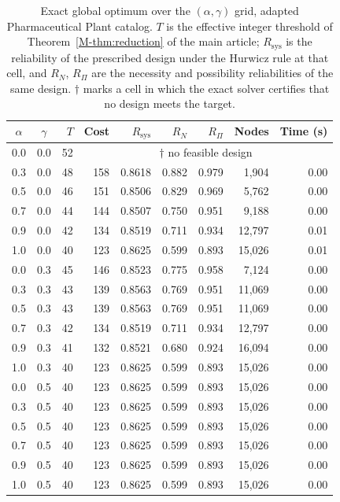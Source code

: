 \begin{table}[!htbp]
\centering
\caption{Exact global optimum over the $(\alpha,\gamma)$ grid, adapted Pharmaceutical Plant catalog. $T$ is the effective integer threshold of Theorem~\ref*{M-thm:reduction} of the main article; $R_{\mathrm{sys}}$ is the reliability of the prescribed design under the Hurwicz rule at that cell, and $R_N$, $R_\Pi$ are the necessity and possibility reliabilities of the same design. $\dagger$ marks a cell in which the exact solver certifies that no design meets the target.}
\label{tab:pharma_stats}
\small
\begin{tabular}{ccrrrrrrr}
\hline
$\alpha$ & $\gamma$ & $T$ & Cost & $R_{\mathrm{sys}}$ & $R_N$ & $R_\Pi$ & Nodes & Time (s)\\
\hline
0.0 & 0.0 & 52 & \multicolumn{6}{c}{$\dagger$ no feasible design} \\
0.3 & 0.0 & 48 & 158 & 0.8618 & 0.882 & 0.979 & 1,904 & 0.00 \\
0.5 & 0.0 & 46 & 151 & 0.8506 & 0.829 & 0.969 & 5,762 & 0.00 \\
0.7 & 0.0 & 44 & 144 & 0.8507 & 0.750 & 0.951 & 9,188 & 0.00 \\
0.9 & 0.0 & 42 & 134 & 0.8519 & 0.711 & 0.934 & 12,797 & 0.01 \\
1.0 & 0.0 & 40 & 123 & 0.8625 & 0.599 & 0.893 & 15,026 & 0.01 \\
\hline
0.0 & 0.3 & 45 & 146 & 0.8523 & 0.775 & 0.958 & 7,124 & 0.00 \\
0.3 & 0.3 & 43 & 139 & 0.8563 & 0.769 & 0.951 & 11,069 & 0.00 \\
0.5 & 0.3 & 43 & 139 & 0.8563 & 0.769 & 0.951 & 11,069 & 0.00 \\
0.7 & 0.3 & 42 & 134 & 0.8519 & 0.711 & 0.934 & 12,797 & 0.00 \\
0.9 & 0.3 & 41 & 132 & 0.8521 & 0.680 & 0.924 & 16,094 & 0.00 \\
1.0 & 0.3 & 40 & 123 & 0.8625 & 0.599 & 0.893 & 15,026 & 0.00 \\
\hline
0.0 & 0.5 & 40 & 123 & 0.8625 & 0.599 & 0.893 & 15,026 & 0.00 \\
0.3 & 0.5 & 40 & 123 & 0.8625 & 0.599 & 0.893 & 15,026 & 0.00 \\
0.5 & 0.5 & 40 & 123 & 0.8625 & 0.599 & 0.893 & 15,026 & 0.00 \\
0.7 & 0.5 & 40 & 123 & 0.8625 & 0.599 & 0.893 & 15,026 & 0.00 \\
0.9 & 0.5 & 40 & 123 & 0.8625 & 0.599 & 0.893 & 15,026 & 0.00 \\
1.0 & 0.5 & 40 & 123 & 0.8625 & 0.599 & 0.893 & 15,026 & 0.00 \\

\end{tabular}
\end{table}
